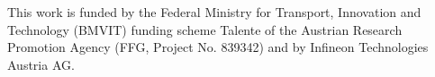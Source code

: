 This work is funded by the Federal Ministry for Transport, Innovation and Technology (BMVIT) funding scheme Talente of the Austrian Research Promotion Agency (FFG, Project No. 839342) and by Infineon Technologies Austria AG.

